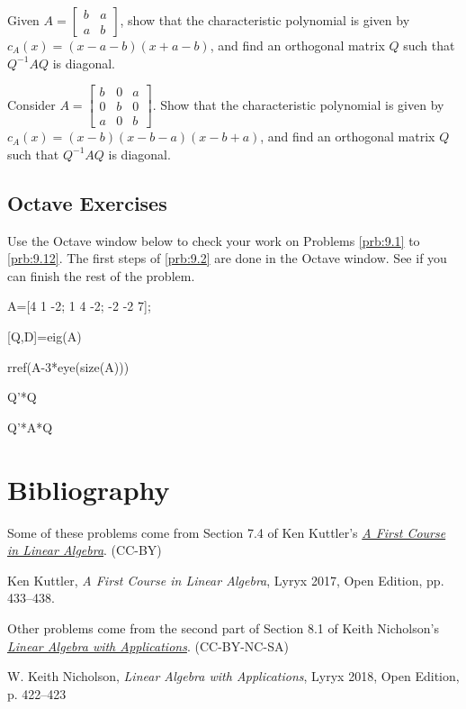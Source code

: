 \documentclass{ximera}
\begin{document}
\begin{problem}\label{prob:ortho13}
Given $A = \begin{bmatrix}
b & a \\
a & b
\end{bmatrix}$, show that the characteristic polynomial is given by $c_{A}(x) = (x - a - b)(x + a - b)$, and find an orthogonal matrix $Q$ such that $Q^{-1}AQ$ is diagonal.
\end{problem}

\begin{problem}\label{prob:ortho14}
Consider $A = \begin{bmatrix}
b & 0 & a \\
0 & b & 0 \\
a & 0 & b
\end{bmatrix}$. Show that the characteristic polynomial is given by $c_{A}(x) = (x - b)(x - b - a)(x - b + a)$, and find an orthogonal matrix $Q$ such that $Q^{-1}AQ$ is diagonal.
\end{problem}


\subsection*{Octave Exercises}
\begin{problem}\label{oct:ortho_diagonalize}
Use the Octave window below to check your work on Problems \ref{prb:9.1} to \ref{prb:9.12}.  The first steps of \ref{prb:9.2} are done in the Octave window.  See if you can finish the rest of the problem.

A=[4 1 -2; 1 4 -2; -2 -2 7];

[Q,D]=eig(A)

rref(A-3*eye(size(A)))

Q'*Q

Q'*A*Q

\end{problem}

\section*{Bibliography}
Some of these problems come from Section 7.4 of Ken Kuttler's \href{https://open.umn.edu/opentextbooks/textbooks/a-first-course-in-linear-algebra-2017}{\it A First Course in Linear Algebra}. (CC-BY)

Ken Kuttler, {\it  A First Course in Linear Algebra}, Lyryx 2017, Open Edition, pp. 433--438.  

Other problems come from the second part of Section 8.1 of Keith Nicholson's \href{https://open.umn.edu/opentextbooks/textbooks/linear-algebra-with-applications}{\it Linear Algebra with Applications}. (CC-BY-NC-SA)

W. Keith Nicholson, {\it Linear Algebra with Applications}, Lyryx 2018, Open Edition, p. 422--423 
\end{document}
